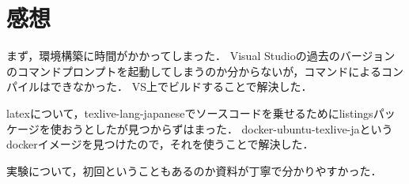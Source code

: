 \documentclass[11pt]{jarticle}
\begin{document}
\section{感想}

まず，環境構築に時間がかかってしまった．
Visual Studioの過去のバージョンのコマンドプロンプトを起動してしまうのか分からないが，コマンドによるコンパイルはできなかった．
VS上でビルドすることで解決した．

latexについて，texlive-lang-japaneseでソースコードを乗せるためにlistingsパッケージを使おうとしたが見つからずはまった．
docker-ubuntu-texlive-jaというdockerイメージを見つけたので，それを使うことで解決した．

実験について，初回ということもあるのか資料が丁寧で分かりやすかった．
\end{document}

